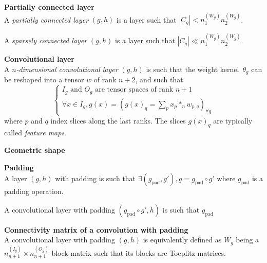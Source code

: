 \begin{definition}\textbf{Partially connected layer}\\
A \emph{partially connected layer} $(g,h)$ is a layer such that $|C_g| < n_1^{(W_g)} n_2^{(W_g)}$.

A \emph{sparsely connected layer} $(g,h)$ is a layer such that $|C_g| \ll n_1^{(W_g)} n_2^{(W_g)}$.
\end{definition}

\begin{definition}\textbf{Convolutional layer}\\
A \emph{$n$-dimensional convolutional layer} $(g,h)$ is such that the weight kernel~$\theta_g$ can be reshaped into a tensor $w$ of rank $n+2$, and such that
$$
\left\{
\begin{array}{l}
  I_g \mbox{ and } O_g \mbox{ are tensor spaces of rank }n+1 \\
  \forall x \in I_g, g(x) = (g(x)_q = \sum\limits_p{x_p \ast_n w_{p,q}})_{\forall q}
\end{array}
\right.
$$
where $p$ and $q$ index slices along the last ranks. The slices $g(x)_q$ are typically called \textit{feature maps}.
\end{definition}

\begin{remark}\textbf{Geometric shape}
\end{remark}

\begin{definition}\textbf{Padding}\\
A layer $(g, h)$ with padding is such that $\exists (g_\text{pad}, g'), g = g_\text{pad} \circ g'$ where $g_\text{pad}$ is a padding operation.

A convolutional layer with padding $(g_\text{pad} \circ g',h)$ is such that $g_\text{pad}$ \todo{}
\end{definition}


\begin{proposition}\textbf{Connectivity matrix of a convolution with padding}\\
A convolutional layer with padding $(g, h)$ is equivalently defined as $W_g$ being a $n_{n+1}^{(I_g)} \times n_{n+1}^{(O_g)}$ block matrix such that its blocks are Toeplitz matrices.
\end{proposition}

